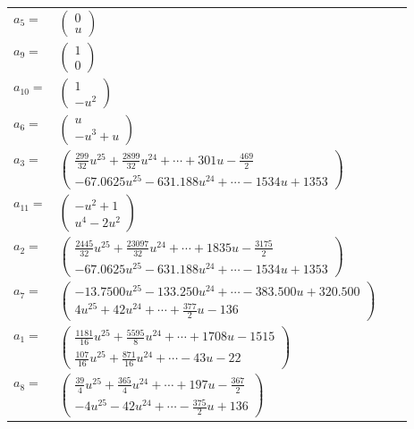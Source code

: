 \documentclass[1p]{elsarticle_modified}
\theoremstyle{definition}
\begin{document}
\begin{tabular}{m{7pt} m{180pt} m{7pt} m{180pt} }
\flushright $a_{5}=$&$\begin{pmatrix}0\\u\end{pmatrix}$ \\
\flushright $a_{9}=$&$\begin{pmatrix}1\\0\end{pmatrix}$ \\
\flushright $a_{10}=$&$\begin{pmatrix}1\\- u^2\end{pmatrix}$ \\
\flushright $a_{6}=$&$\begin{pmatrix}u\\- u^3+u\end{pmatrix}$ \\
\flushright $a_{3}=$&$\begin{pmatrix}\frac{299}{32} u^{25}+\frac{2899}{32} u^{24}+\cdots+301 u-\frac{469}{2}\\-67.0625 u^{25}-631.188 u^{24}+\cdots-1534 u+1353\end{pmatrix}$ \\
\flushright $a_{11}=$&$\begin{pmatrix}- u^2+1\\u^4-2 u^2\end{pmatrix}$ \\
\flushright $a_{2}=$&$\begin{pmatrix}\frac{2445}{32} u^{25}+\frac{23097}{32} u^{24}+\cdots+1835 u-\frac{3175}{2}\\-67.0625 u^{25}-631.188 u^{24}+\cdots-1534 u+1353\end{pmatrix}$ \\
\flushright $a_{7}=$&$\begin{pmatrix}-13.7500 u^{25}-133.250 u^{24}+\cdots-383.500 u+320.500\\4 u^{25}+42 u^{24}+\cdots+\frac{377}{2} u-136\end{pmatrix}$ \\
\flushright $a_{1}=$&$\begin{pmatrix}\frac{1181}{16} u^{25}+\frac{5595}{8} u^{24}+\cdots+1708 u-1515\\\frac{107}{16} u^{25}+\frac{871}{16} u^{24}+\cdots-43 u-22\end{pmatrix}$ \\
\flushright $a_{8}=$&$\begin{pmatrix}\frac{39}{4} u^{25}+\frac{365}{4} u^{24}+\cdots+197 u-\frac{367}{2}\\-4 u^{25}-42 u^{24}+\cdots-\frac{375}{2} u+136\end{pmatrix}$ \\

\end{tabular}
\end{document}
